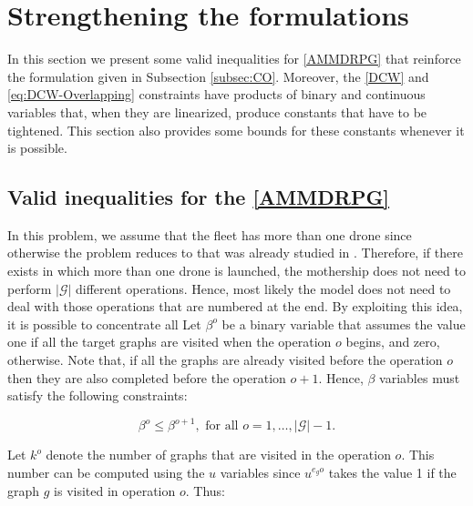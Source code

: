 \section{Strengthening the formulations}\label{bounds} %
\noindent
In this section\CV{,} we present some valid inequalities for \ref{AMMDRPG} that reinforce the formulation given in Subsection \ref{subsec:CO}. Moreover, the \eqref{DCW} and \eqref{eq:DCW-Overlapping} constraints have products of binary and continuous variables that, when they are linearized, produce  constants that have to be tightened. This section also provides some bounds for these constants whenever it is possible. 



\subsection{Valid inequalities for the \ref{AMMDRPG}}
\noindent
In this problem, we assume that the fleet has more than one drone since otherwise the problem reduces to  that was already studied in \cite{art:Amorosi2021}. Therefore, if there exists  in which more than one drone is launched, the mothership does not need to perform $|\mathcal G|$ different operations. Hence, most likely the model does not need to deal with those operations that are numbered at the end. By exploiting this idea, it is possible to concentrate all 
\noindent
Let $\beta^o$ be a binary variable that assumes the value one if all the target graphs are visited when the operation $o$ begins, and zero, otherwise. Note that, if all the graphs are already visited before the operation $o$ then they are also completed before the operation $o+1$. Hence, $\beta$ variables must satisfy the following constraints:

\begin{equation}\tag{Monotonicity}\label{eq:Monotonicity}
\beta^o \leq \beta^{o+1}, \mbox{ for all } o=1,\ldots, |\mathcal{G}|-1.
\end{equation}

\noindent
Let $k^o$ denote the number of graphs that are visited in the operation $o$. This number can be computed using the $u$ variables since $u^{e_go}$ takes the value 1 if the graph $g$ is visited in operation $o$. Thus:

